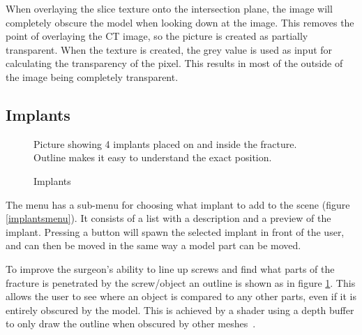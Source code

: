 \documentclass[a4paper]{report}
\begin{document}
When overlaying the slice texture onto the intersection plane, the image will completely obscure the model when looking down at the image. This removes the point of overlaying the CT image, so the picture is created as partially transparent. When the texture is created, the grey value is used as input for calculating the transparency of the pixel. This results in most of the outside of the image being completely transparent.

\subsection{Implants}

\begin{figure}[h!]
    \centering
	\hfill
	\caption{Implants}\label{implants}
  \small
  Picture showing 4 implants placed on and inside the fracture. Outline makes it easy to understand the exact position.
\end{figure}

The menu has a sub-menu for choosing what implant to add to the scene (figure \ref{implantsmenu}). It consists of a list with a description and a preview of the implant. Pressing a button will spawn the selected implant in front of the user, and can then be moved in the same way a model part can be moved.

To improve the surgeon's ability to line up screws and find what parts of the fracture is penetrated by the screw/object an outline is shown as in figure \ref{implants}. This allows the user to see where an object is compared to any other parts, even if it is entirely obscured by the model. This is achieved by a shader using a depth buffer to only draw the outline when obscured by other meshes~\cite{technologies_unity_nodate-1}.
\end{document}

